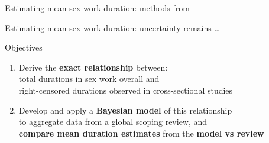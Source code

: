 \begin{frame}{Estimating mean sex work duration: methods from \citep{Fazito2012}}
  
\end{frame}
\begin{frame}{Estimating mean sex work duration: uncertainty remains \dots}
  \centering{}
\end{frame}
\begin{frame}{Objectives}\let\emph\textbf
  \begin{enumerate}
    \item Derive the \emph{exact relationship} between:
       \\ total durations in sex work overall and
       \\ right-censored durations observed in cross-sectional studies
    \item Develop and apply a \emph{Bayesian model} of this relationship
       \\ to aggregate data from a global scoping review, and
       \\ \emph{compare mean duration estimates} from the \emph{model vs review}
  \end{enumerate}
\end{frame}
